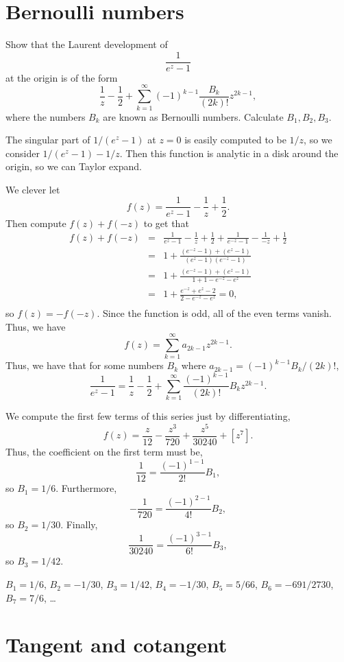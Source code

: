 \documentclass{article}
\begin{document}
\section{Bernoulli numbers}

Show that the Laurent development of
$$ \frac{1}{e^z - 1} $$
at the origin is of the form
$$ \frac{1}{z} - \frac{1}{2} + \sum_{k=1}^\infty (-1)^{k-1} \frac{B_k}{(2k)!} z^{2k-1}, $$
where the numbers $B_k$ are known as Bernoulli numbers.  Calculate $B_1, B_2, B_3$.

The singular part of $1/(e^z - 1)$ at $z = 0$ is easily computed to be $1/z$, so we consider $1/(e^z - 1) - 1/z$.  Then this function is analytic in a disk around the origin, so we can Taylor expand.

We clever let
$$ f(z) = \frac{1}{e^z - 1} - \frac{1}{z} + \frac{1}{2}. $$
Then compute $f(z) + f(-z)$ to get that
\begin{eqnarray*}
f(z) + f(-z) &=& \frac{1}{e^z - 1} - \frac{1}{z} + \frac{1}{2} + \frac{1}{e^{-z} - 1} - \frac{1}{-z} + \frac{1}{2} \\
&=& 1 + \frac{(e^{-z} - 1) + (e^z - 1)}{(e^z - 1)(e^{-z} - 1)} \\
&=& 1 + \frac{(e^{-z} - 1) + (e^z - 1)}{1 + 1 - e^{-z} - e^{z}} \\
&=& 1 + \frac{e^{-z} + e^z - 2}{2 - e^{-z} - e^{z}} = 0, \\
\end{eqnarray*}
so $f(z) = -f(-z)$.  Since the function is odd, all of the even terms vanish.  Thus, we have
$$ f(z) = \sum_{k=1}^\infty a_{2k-1} z^{2k-1}. $$
Thus, we have that for some numbers $B_k$ where $a_{2k-1} = (-1)^{k-1} B_k/(2k)!$,
$$ \frac{1}{e^z - 1} = \frac{1}{z} - \frac{1}{2} + \sum_{k=1}^\infty \frac{(-1)^{k-1}}{(2k)!} B_k z^{2k-1}. $$

We compute the first few terms of this series just by differentiating,
$$ f(z) = \frac{z}{12} - \frac{z^3}{720} + \frac{z^5}{30240} + [z^7]. $$
Thus, the coefficient on the first term must be,
$$ \frac{1}{12} = \frac{(-1)^{1-1}}{2!} B_1, $$
so $B_1 = 1/6$.  Furthermore,
$$ -\frac{1}{720} = \frac{(-1)^{2-1}}{4!} B_2, $$
so $B_2 = 1/30$.  Finally,
$$ \frac{1}{30240} = \frac{(-1)^{3-1}}{6!} B_3, $$
so $B_3 = 1/42$.

$B_1 = 1/6$, $B_2 = −1/30$, $B_3 = 1/42$, $B_4 = −1/30$, $B_5 = 5/66$,
$B_6 = −691/2730$, $B_7 = 7/6$, \ldots


\section{Tangent and cotangent}
\end{document}
